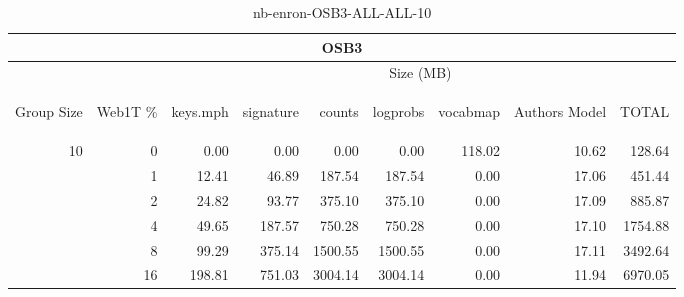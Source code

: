 \begin{center}
\begin{table}[htbp] 
 \begin{center}
\begin{tabular}{ | r | r | r | r | r | r | r | r | r |}
\hline
\multicolumn{9}{|c|}{OSB3}\\
\hline
 & & \multicolumn{7}{|c|}{Size (MB)}\\ \cline{3-9}
\begin{sideways}Group Size\end{sideways} & \begin{sideways}Web1T \% \end{sideways} & \begin{sideways}keys.mph\end{sideways} & \begin{sideways}signature\end{sideways} & \begin{sideways}counts\end{sideways} & \begin{sideways}logprobs\end{sideways} & \begin{sideways}vocabmap\end{sideways} & \begin{sideways}Authors Model \end{sideways} & \begin{sideways}TOTAL\end{sideways}\\
\hline
\multirow{5}{*}{10}
 & 0 & 0.00 & 0.00 & 0.00 & 0.00 & 118.02 & 10.62 & 128.64\\ \cline{2-9}
 & 1 & 12.41 & 46.89 & 187.54 & 187.54 & 0.00 & 17.06 & 451.44\\ \cline{2-9}
 & 2 & 24.82 & 93.77 & 375.10 & 375.10 & 0.00 & 17.09 & 885.87\\ \cline{2-9}
 & 4 & 49.65 & 187.57 & 750.28 & 750.28 & 0.00 & 17.10 & 1754.88\\ \cline{2-9}
 & 8 & 99.29 & 375.14 & 1500.55 & 1500.55 & 0.00 & 17.11 & 3492.64\\ \cline{2-9}
 & 16 & 198.81 & 751.03 & 3004.14 & 3004.14 & 0.00 & 11.94 & 6970.05\\ \cline{2-9}
\hline
\end{tabular}
\caption{nb-enron-OSB3-ALL-ALL-10}
\label{table:nb-enron-OSB3-ALL-ALL-10}
\end{center}
 \end{table}
\end{center}

